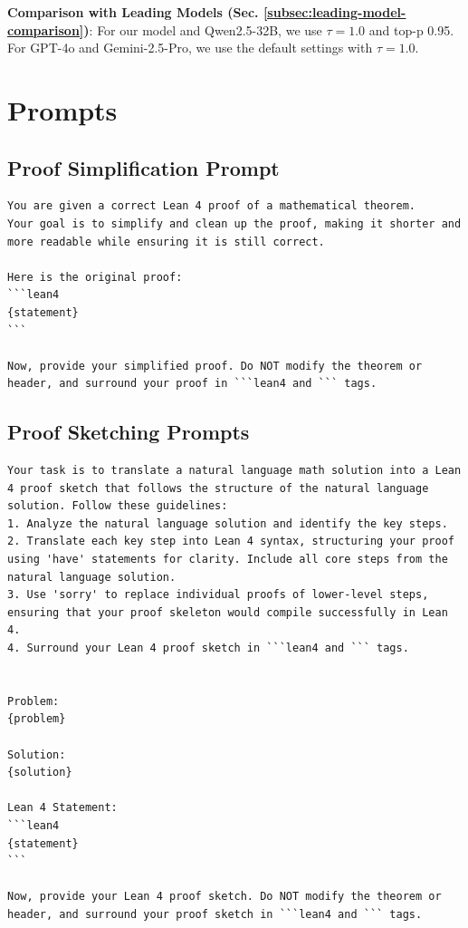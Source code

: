 \textbf{Comparison with Leading Models (Sec. \ref{subsec:leading-model-comparison})}: For our model and Qwen2.5-32B, we use $\tau=1.0$ and top-p 0.95. For GPT-4o and Gemini-2.5-Pro, we use the default settings with $\tau=1.0$. 

\newpage
\section{Prompts} \label{sec:appendix-prompts}

\subsection{Proof Simplification Prompt} 
\begin{lstlisting}[caption={Zero-shot Proof Sketching Prompt},label={prompt-proof-simp}, captionpos=t, breaklines=true, style=mystyle]
You are given a correct Lean 4 proof of a mathematical theorem.
Your goal is to simplify and clean up the proof, making it shorter and more readable while ensuring it is still correct.

Here is the original proof:
```lean4
{statement}
```

Now, provide your simplified proof. Do NOT modify the theorem or header, and surround your proof in ```lean4 and ``` tags.
\end{lstlisting}

\subsection{Proof Sketching Prompts}

\begin{lstlisting}[caption={Zero-shot Proof Sketching Prompt},label={prompt-sketch-zeroshot}, captionpos=t, breaklines=true, style=mystyle]
Your task is to translate a natural language math solution into a Lean 4 proof sketch that follows the structure of the natural language solution. Follow these guidelines:
1. Analyze the natural language solution and identify the key steps.
2. Translate each key step into Lean 4 syntax, structuring your proof using 'have' statements for clarity. Include all core steps from the natural language solution.
3. Use 'sorry' to replace individual proofs of lower-level steps, ensuring that your proof skeleton would compile successfully in Lean 4.
4. Surround your Lean 4 proof sketch in ```lean4 and ``` tags.


Problem:
{problem}

Solution:
{solution}

Lean 4 Statement:
```lean4
{statement}
```

Now, provide your Lean 4 proof sketch. Do NOT modify the theorem or header, and surround your proof sketch in ```lean4 and ``` tags.
\end{lstlisting}


